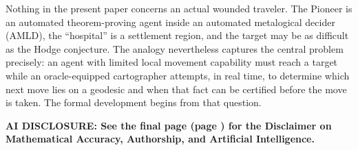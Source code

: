 \documentclass[11pt]{article}
\theoremstyle{definition}
\theoremstyle{remark}
\begin{document}
Nothing in the present paper concerns an actual wounded traveler. The Pioneer is an automated theorem-proving agent inside an automated metalogical decider (AMLD), the ``hospital'' is a settlement region, and the target may be as difficult as the Hodge conjecture. The analogy nevertheless captures the central problem precisely: an agent with limited local movement capability must reach a target while an oracle-equipped cartographer attempts, in real time, to determine which next move lies on a geodesic and when that fact can be certified before the move is taken. The formal development begins from that question.

\noindent\textbf{AI DISCLOSURE: See the final page (page \pageref{sec:ai-disclaimer}) for the Disclaimer on Mathematical Accuracy, Authorship, and Artificial Intelligence.}
\end{document}
